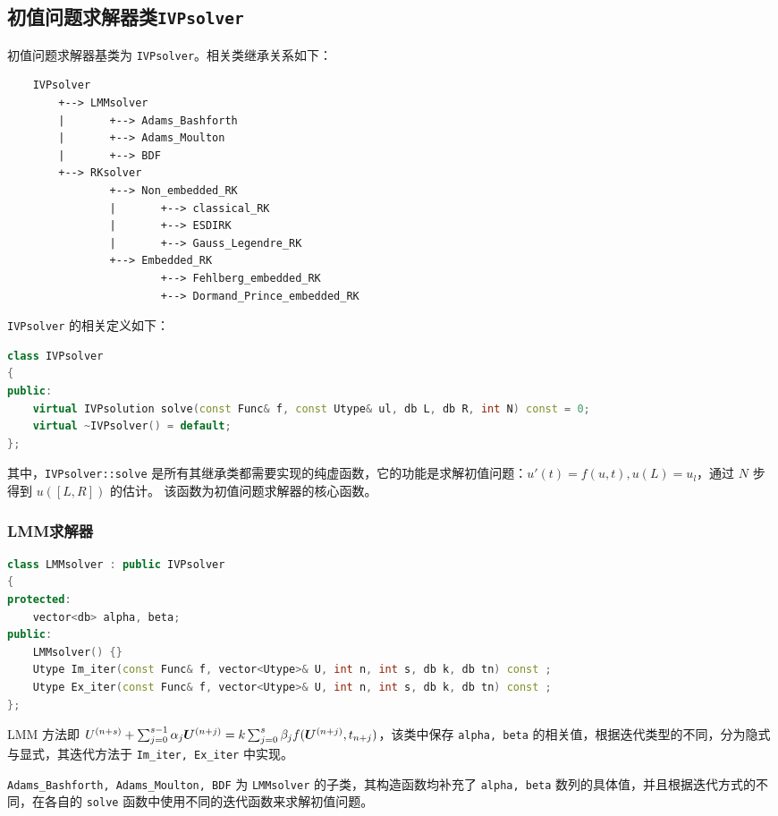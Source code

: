 \documentclass[lang=cn,a4paper,newtx,bibend=bibtex]{elegantpaper}
\begin{document}
\subsection{初值问题求解器类\lstinline{IVPsolver}}
初值问题求解器基类为 \lstinline{IVPsolver}。相关类继承关系如下：
\begin{verbatim}
    IVPsolver
        +--> LMMsolver
        |       +--> Adams_Bashforth
        |       +--> Adams_Moulton
        |       +--> BDF
        +--> RKsolver
                +--> Non_embedded_RK
                |       +--> classical_RK
                |       +--> ESDIRK
                |       +--> Gauss_Legendre_RK
                +--> Embedded_RK
                        +--> Fehlberg_embedded_RK
                        +--> Dormand_Prince_embedded_RK
\end{verbatim}
\lstinline{IVPsolver} 的相关定义如下：
\begin{lstlisting}[language=C++]
class IVPsolver
{
public:
    virtual IVPsolution solve(const Func& f, const Utype& ul, db L, db R, int N) const = 0;
    virtual ~IVPsolver() = default;
};
\end{lstlisting}
其中，\lstinline{IVPsolver::solve} 是所有其继承类都需要实现的纯虚函数，它的功能是求解初值问题：$u'(t) = f(u, t), u(L)=u_l$，通过 $N$ 步得到 $u([L,R])$ 的估计。 该函数为初值问题求解器的核心函数。

\subsubsection{LMM求解器}

\begin{lstlisting}[language=C++]
class LMMsolver : public IVPsolver
{
protected:
    vector<db> alpha, beta;
public:
    LMMsolver() {}
    Utype Im_iter(const Func& f, vector<Utype>& U, int n, int s, db k, db tn) const ;
    Utype Ex_iter(const Func& f, vector<Utype>& U, int n, int s, db k, db tn) const ;
};
\end{lstlisting}

LMM 方法即 $U^{(n+s)} + \sum_{j=0}^{s-1} \alpha_j \bm{U}^{(n+j)} = k \sum_{j=0}^s \beta_j f(\bm{U}^{(n+j)}, t_{n+j})$，该类中保存 \texttt{alpha, beta} 的相关值，根据迭代类型的不同，分为隐式与显式，其迭代方法于 \lstinline{Im_iter, Ex_iter} 中实现。

\lstinline{Adams_Bashforth, Adams_Moulton, BDF} 为 \lstinline{LMMsolver} 的子类，其构造函数均补充了 \texttt{alpha, beta} 数列的具体值，并且根据迭代方式的不同，在各自的 \texttt{solve} 函数中使用不同的迭代函数来求解初值问题。
\end{document}
